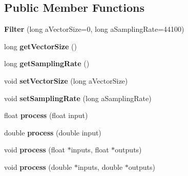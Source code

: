 \subsection*{Public Member Functions}
\begin{DoxyCompactItemize}
\item 
\hypertarget{class_filter_a5c6deec2210aaa2664d512ec35a5dfc0}{{\bfseries Filter} (long a\-Vector\-Size=0, long a\-Sampling\-Rate=44100)}\label{class_filter_a5c6deec2210aaa2664d512ec35a5dfc0}

\item 
\hypertarget{class_filter_aa8f928748937e51095a22ce29c9c08c4}{long {\bfseries get\-Vector\-Size} ()}\label{class_filter_aa8f928748937e51095a22ce29c9c08c4}

\item 
\hypertarget{class_filter_aceb44fa5badb70e5f35fd7388288650b}{long {\bfseries get\-Sampling\-Rate} ()}\label{class_filter_aceb44fa5badb70e5f35fd7388288650b}

\item 
\hypertarget{class_filter_a8ee16a822086b1a96ac6b625c77d923d}{void {\bfseries set\-Vector\-Size} (long a\-Vector\-Size)}\label{class_filter_a8ee16a822086b1a96ac6b625c77d923d}

\item 
\hypertarget{class_filter_a02c21fa49f5a8837a1ece9db10722493}{void {\bfseries set\-Sampling\-Rate} (long a\-Sampling\-Rate)}\label{class_filter_a02c21fa49f5a8837a1ece9db10722493}

\item 
\hypertarget{class_filter_ac7f8d9d379dcc40e98d4204eac023f22}{float {\bfseries process} (float input)}\label{class_filter_ac7f8d9d379dcc40e98d4204eac023f22}

\item 
\hypertarget{class_filter_a2379f87a7f71d76069abfcc090aaa24c}{double {\bfseries process} (double input)}\label{class_filter_a2379f87a7f71d76069abfcc090aaa24c}

\item 
\hypertarget{class_filter_a250100634bd88b32db92b248cc49d2d7}{void {\bfseries process} (float $\ast$inputs, float $\ast$outputs)}\label{class_filter_a250100634bd88b32db92b248cc49d2d7}

\item 
\hypertarget{class_filter_ab5c77fb6f129588d6b1fedb51de1b12e}{void {\bfseries process} (double $\ast$inputs, double $\ast$outputs)}\label{class_filter_ab5c77fb6f129588d6b1fedb51de1b12e}

\end{DoxyCompactItemize}
